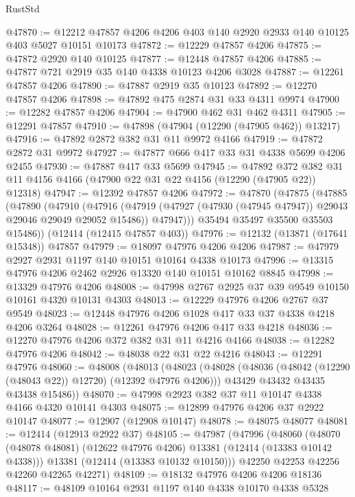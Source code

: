 \begin{lexlean}{RustStd}
\begin{coremodule}
@47870 := @12212 @47857 @4206 @4206 @403 @140 @2920 @2933 @140 @10125 @403 @5027 @10151 @10173
@47872 := @12229 @47857 @4206
@47875 := @47872 @2920 @140 @10125
@47877 := @12448 @47857 @4206
@47885 := @47877 @721 @2919 @35 @140 @4338 @10123 @4206 @3028
@47887 := @12261 @47857 @4206
@47890 := @47887 @2919 @35 @10123
@47892 := @12270 @47857 @4206
@47898 := @47892 @475 @2874 @31 @33 @4311 @9974
@47900 := @12282 @47857 @4206
@47904 := @47900 @462 @31 @462 @4311
@47905 := @12291 @47857
@47910 := @47898 (@47904 (@12290 (@47905 @462)) @13217)
@47916 := @47892 @2872 @382 @31 @11 @9972 @4166
@47919 := @47872 @2872 @31 @9972
@47927 := @47877 @666 @417 @33 @31 @4338 @5699 @4206 @2455
@47930 := @47887 @417 @33 @5699
@47945 := @47892
    @372
    @382
    @31
    @11
    @4156
    @4166
    (@47900 @22 @31 @22 @4156 (@12290 (@47905 @22)) @12318)
@47947 := @12392 @47857 @4206
@47972 := @47870
    (@47875
      (@47885
        (@47890
          (@47910
            (@47916
              (@47919 (@47927 (@47930 (@47945 @47947)) @29043 @29046 @29049 @29052 @15486))
              @47947)))
        @35494
        @35497
        @35500
        @35503
        @15486))
    (@12414 (@12415 @47857 @403))
@47976 := @12132 (@13871 (@17641 @15348)) @47857
@47979 := @18097 @47976 @4206 @4206
@47987 := @47979 @2927 @2931 @1197 @140 @10151 @10164 @4338 @10173
@47996 := @13315 @47976 @4206 @2462 @2926 @13320 @140 @10151 @10162 @8845
@47998 := @13329 @47976 @4206
@48008 := @47998 @2767 @2925 @37 @39 @9549 @10150 @10161 @4320 @10131 @4303
@48013 := @12229 @47976 @4206 @2767 @37 @9549
@48023 := @12448 @47976 @4206 @1028 @417 @33 @37 @4338 @4218 @4206 @3264
@48028 := @12261 @47976 @4206 @417 @33 @4218
@48036 := @12270 @47976 @4206 @372 @382 @31 @11 @4216 @4166
@48038 := @12282 @47976 @4206
@48042 := @48038 @22 @31 @22 @4216
@48043 := @12291 @47976
@48060 := @48008
    (@48013
      (@48023
        (@48028 (@48036 (@48042 (@12290 (@48043 @22)) @12720) (@12392 @47976 @4206)))
        @43429
        @43432
        @43435
        @43438
        @15486))
@48070 := @47998 @2923 @382 @37 @11 @10147 @4338 @4166 @4320 @10141 @4303
@48075 := @12899 @47976 @4206 @37 @2922 @10147
@48077 := @12907 (@12908 @10147)
@48078 := @48075 @48077
@48081 := @12414 (@12913 @2922 @37)
@48105 := @47987
    (@47996
      (@48060
        (@48070 (@48078 @48081) (@12622 @47976 @4206) @13381 (@12414 (@13383 @10142 @4338)))
        @13381
        (@12414 (@13383 @10132 @10150)))
      @42250
      @42253
      @42256
      @42260
      @42265
      @42271)
@48109 := @18132 @47976 @4206 @4206 @18136
@48117 := @48109 @10164 @2931 @1197 @140 @4338 @10170 @4338 @5328

\end{coremodule}
\end{lexlean}
